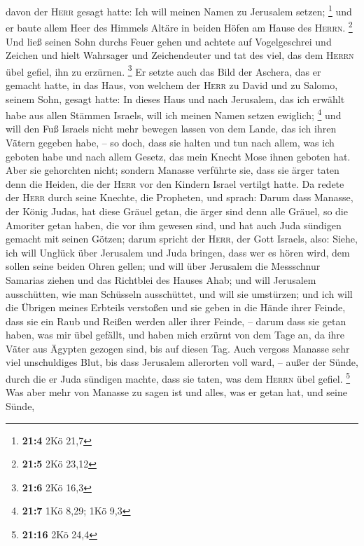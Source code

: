 davon der \textsc{Herr} gesagt hatte: Ich will meinen Namen zu Jerusalem
setzen; \footnote{\textbf{21:4} 2Kö 21,7}  und er baute
allem Heer des Himmels Altäre in beiden Höfen am Hause des
\textsc{Herrn}. \footnote{\textbf{21:5} 2Kö 23,12}  Und
ließ seinen Sohn durchs Feuer gehen und achtete auf Vogelgeschrei und
Zeichen und hielt Wahrsager und Zeichendeuter und tat des viel, das dem
\textsc{Herrn} übel gefiel, ihn zu erzürnen. \footnote{\textbf{21:6} 2Kö
  16,3}  Er setzte auch das Bild der Aschera, das er
gemacht hatte, in das Haus, von welchem der \textsc{Herr} zu David und
zu Salomo, seinem Sohn, gesagt hatte: In dieses Haus und nach Jerusalem,
das ich erwählt habe aus allen Stämmen Israels, will ich meinen Namen
setzen ewiglich; \footnote{\textbf{21:7} 1Kö 8,29; 1Kö 9,3}
 und will den Fuß Israels nicht mehr bewegen lassen von
dem Lande, das ich ihren Vätern gegeben habe, -- so doch, dass sie
halten und tun nach allem, was ich geboten habe und nach allem Gesetz,
das mein Knecht Mose ihnen geboten hat.  Aber sie
gehorchten nicht; sondern Manasse verführte sie, dass sie ärger taten
denn die Heiden, die der \textsc{Herr} vor den Kindern Israel vertilgt
hatte.  Da redete der \textsc{Herr} durch seine Knechte,
die Propheten, und sprach:  Darum dass Manasse, der König
Judas, hat diese Gräuel getan, die ärger sind denn alle Gräuel, so die
Amoriter getan haben, die vor ihm gewesen sind, und hat auch Juda
sündigen gemacht mit seinen Götzen;  darum spricht der
\textsc{Herr}, der Gott Israels, also: Siehe, ich will Unglück über
Jerusalem und Juda bringen, dass wer es hören wird, dem sollen seine
beiden Ohren gellen;  und will über Jerusalem die
Messschnur Samarias ziehen und das Richtblei des Hauses Ahab; und will
Jerusalem ausschütten, wie man Schüsseln ausschüttet, und will sie
umstürzen;  und ich will die Übrigen meines Erbteils
verstoßen und sie geben in die Hände ihrer Feinde, dass sie ein Raub und
Reißen werden aller ihrer Feinde, --  darum dass sie
getan haben, was mir übel gefällt, und haben mich erzürnt von dem Tage
an, da ihre Väter aus Ägypten gezogen sind, bis auf diesen Tag.
 Auch vergoss Manasse sehr viel unschuldiges Blut, bis
dass Jerusalem allerorten voll ward, -- außer der Sünde, durch die er
Juda sündigen machte, dass sie taten, was dem \textsc{Herrn} übel
gefiel. \footnote{\textbf{21:16} 2Kö 24,4}  Was aber mehr
von Manasse zu sagen ist und alles, was er getan hat, und seine Sünde,
